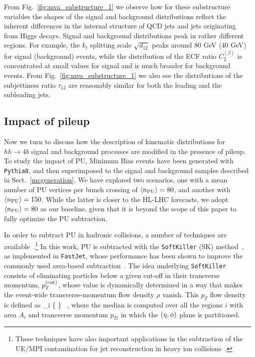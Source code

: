 From Fig.~\ref{fig:mva_substructure_1}
we observe how for these substructure variables the shapes of the signal
and background distributions reflect
the inherent differences in the internal structure of
QCD jets and jets originating from Higgs decays.
%
Signal and background distributions peak
in rather
different regions. For example, the $k_t$ splitting scale $\sqrt{d_{12}}$
peaks around 80 GeV (40 GeV) for signal (background) events, while
the distribution of the
ECF ratio $C_2^{(\beta)}$ is concentrated at small values
for signal and is much broader for background events.
%
From Fig.~\ref{fig:mva_substructure_1} we also see
the distributions of the subjettiness ratio $\tau_{12}$ are
reasonably similar
for both the leading and the subleading jets.
%

\subsection{Impact of pileup}
\label{sec:pileup}

Now we turn to discuss how the description of kinematic
distributions for $hh\to 4b$ signal
and background processes are
modified in the presence of pileup.
%
To study the impact of PU,
Minimum Bias events have been generated
with {\tt Pythia8}, and then
superimposed to the signal
and background samples described in Sect.~\ref{mcgeneration}.
%
We have explored two scenarios,
one with a mean number of
PU vertices per bunch crossing of $\left\langle n_{\rm PU}\right\rangle=80$,
and another
with $\left\langle n_{\rm PU}\right\rangle=150$.
%
While the latter is closer to the HL-LHC forecasts,
we adopt $\left\langle n_{\rm PU}\right\rangle=80$ as our baseline,
given that it
is beyond the scope of this paper to fully optimize
the PU subtraction.

%
In order to subtract PU in hadronic collisions, a number of techniques
are available~\cite{Cacciari:2009dp,TheATLAScollaboration:2013pia,Butterworth:2008iy,Cacciari:2007fd,Krohn:2009th,Krohn:2013lba,Cacciari:2008gd,Ellis:2009me,Bertolini:2014bba,Cacciari:2014gra,Cacciari:2014jta,Berta:2014eza,Larkoski:2014wba}.\footnote{
These techniques have also important applications in the subtraction
of the UE/MPI contamination for jet reconstruction
in heavy ion collisions~\cite{Cacciari:2010te}.
}
%
In this work, PU  is subtracted
with the {\tt SoftKiller} (SK)
method~\cite{Cacciari:2014gra}, as implemented in {\tt FastJet},
whose performance has been shown to
improve the commonly used area-based subtraction~\cite{Cacciari:2009dp}.
%
The idea underlying {\tt SoftKiller} consists of eliminating particles
below a given cut-off in their transverse momentum, $p_T^{\rm (cut)}$, whose
value is dynamically determined in a way that makes the event-wide
transverse-momentum flow density $\rho$ vanish.
%
This $p_T$ flow density is defined as
\be
\rho{}_i \Bigg\{ \Bigg\} \, ,
\ee
where the median is computed over all the regions $i$ with area
$A_i$ and transverse momentum $p_{Ti}$ in which the $\left( \eta,\phi\right)$ plane
is partitioned.


